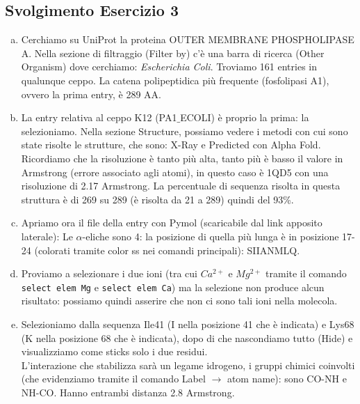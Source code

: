 \documentclass{article}
\begin{document}
\subsection*{Svolgimento Esercizio 3}
\begin{enumerate}[a)]
   \item Cerchiamo su UniProt la proteina OUTER MEMBRANE PHOSPHOLIPASE A. Nella sezione di filtraggio (Filter by) c'è una barra di ricerca (Other Organism) dove cerchiamo: \textit{Escherichia Coli}. Troviamo 161 entries in qualunque ceppo. La catena polipeptidica più frequente (fosfolipasi A1), ovvero la prima entry, è 289 AA.
   \item La entry relativa al ceppo K12 (PA1$\_$ECOLI) è proprio la prima: la selezioniamo. Nella sezione Structure, possiamo vedere i metodi con cui sono state risolte le strutture, che sono: X-Ray e Predicted con Alpha Fold. Ricordiamo che la risoluzione è tanto più alta, tanto più è basso il valore in Armstrong (errore associato agli atomi), in questo caso è 1QD5 con una risoluzione di 2.17 Armstrong. La percentuale di sequenza risolta in questa struttura è di 269 su 289 (è risolta da 21 a 289) quindi del 93\%.
   \item Apriamo ora il file della entry con Pymol (scaricabile dal link apposito laterale): Le $\alpha$-eliche sono 4: la posizione di quella più lunga è in posizione 17-24 (colorati tramite color ss nei comandi principali): SIIANMLQ. 
   \item Proviamo a selezionare i due ioni (tra cui $Ca^{2+}$ e $Mg^{2+}$ tramite il comando \texttt{select elem Mg} e \texttt{select elem Ca}) ma la selezione non produce alcun risultato: possiamo quindi asserire che non ci sono tali ioni nella molecola.
   \item Selezioniamo dalla sequenza Ile41 (I nella posizione 41 che è indicata) e Lys68 (K nella posizione 68 che è indicata), dopo di che nascondiamo tutto (Hide) e visualizziamo come sticks solo i due residui.\\ L'interazione che stabilizza sarà un legame idrogeno, i gruppi chimici coinvolti (che evidenziamo tramite il comando Label $\rightarrow$ atom name): sono CO-NH e NH-CO. Hanno entrambi distanza 2.8 Armstrong.
\end{enumerate}
\end{document}
